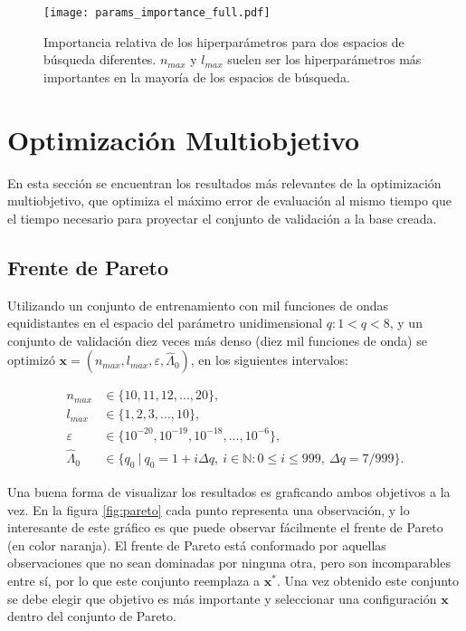 \begin{figure}[h!]
\centering
\texttt{[image: params\_importance\_full.pdf]}
\caption{Importancia relativa de los hiperparámetros para dos espacios de búsqueda diferentes. $n_{max}$ y $l_{max}$ suelen ser los hiperparámetros más importantes en la mayoría de los espacios de búsqueda.}
\label{fig:param_import}
\end{figure}




\section{Optimización Multiobjetivo}

En esta sección se encuentran los resultados más relevantes de la optimización multiobjetivo, que optimiza el máximo error de evaluación al mismo tiempo que el tiempo necesario para proyectar el conjunto de validación a la base creada.

\subsection{Frente de Pareto}

Utilizando un conjunto de entrenamiento con mil funciones de ondas equidistantes en el espacio del parámetro unidimensional $q: 1 < q < 8$, y un conjunto de validación diez veces más denso (diez mil funciones de onda) se optimizó $\textbf{x} = (n_{max}, l_{max},\varepsilon, \hat{\Lambda}_0)$, en los siguientes intervalos:

\begin{align*}
n_{max} &\in \{10, 11, 12, ..., 20\},\\
l_{max} &\in \{1, 2, 3, ..., 10 \},\\
\varepsilon &\in \{  10^{-20}, 10^{-19}, 10^{-18}, ..., 10^{-6}\}, \\
\hat{\Lambda}_0 &\in \{q_0 \ | \ q_0 = 1 + i \Delta q, \ i\in \mathbb{N} : 0 \le i \le 999, \ \Delta q = 7/999 \}.
\end{align*}

Una buena forma de visualizar los resultados es graficando ambos objetivos a la vez. En la figura \ref{fig:pareto} cada punto representa una observación, y lo interesante de este gráfico es que puede observar fácilmente el frente de Pareto (en color naranja). El frente de Pareto está conformado por aquellas observaciones que no sean dominadas por ninguna otra, pero son incomparables entre sí, por lo que este conjunto reemplaza a $\textbf{x}^*$. Una vez obtenido este conjunto se debe elegir que objetivo es más importante y seleccionar una configuración $\textbf{x}$ dentro del conjunto de Pareto.

